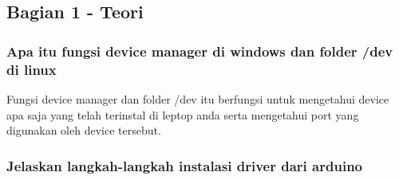 \subsection{Bagian 1 - Teori}
\subsubsection{Apa itu fungsi device manager di windows dan folder /dev di linux}
Fungsi device manager dan folder /dev itu berfungsi untuk mengetahui device apa saja yang telah terinstal di leptop anda serta mengetahui port yang digunakan oleh device tersebut.

\subsubsection{Jelaskan langkah-langkah instalasi driver dari arduino}
